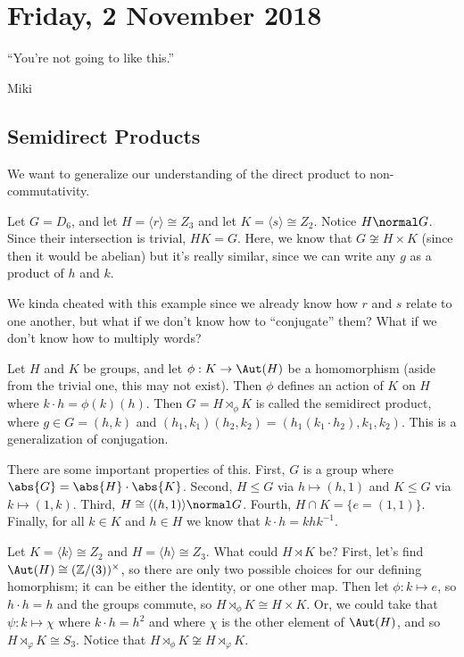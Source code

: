 \section{Friday, 2 November 2018}

\epigraph{``You're not going to like this.''}{Miki}

\subsection{Semidirect Products}
We want to generalize our understanding of the direct product to non-commutativity.

\begin{example}
Let $G = D_6$, and let $H = \langle r  \rangle \cong Z_3$ and let $K = \langle s \rangle \cong Z_2$. Notice $H \normal G$. Since their intersection is trivial, $HK = G$. Here, we know that $G \not\cong H \times K$ (since then it would be abelian) but it's really similar, since we can write any $g$ as a product of $h$ and $k$.
\end{example}

We kinda cheated with this example since we already know how $r$ and $s$ relate to one another, but what if we don't know how to ``conjugate'' them? What if we don't know how to multiply words?

\begin{definition}
Let $H$ and $K$ be groups, and let $\phi : K \to \Aut(H)$ be a homomorphism (aside from the trivial one, this may not exist). Then $\phi$ defines an action of $K$ on $H$ where $k \cdot h = \phi(k)(h)$. Then $G = H \rtimes_\phi K$ is called the semidirect product, where $g \in G = (h,k)$ and $(h_1,k_1)(h_2,k_2) = (h_1(k_1 \cdot h_2), k_1,k_2)$. This is a generalization of conjugation.
\end{definition}

There are some important properties of this. First, $G$ is a group where $\abs{G} = \abs{H} \cdot \abs{K}$. Second, $H \leq G$ via $h \mapsto (h,1)$ and $K \leq G$ via $k \mapsto (1,k)$. Third, $H \cong \langle (h,1) \rangle \normal G$. Fourth, $H \cap K = \{e = (1,1)\}$. Finally, for all $k \in K$ and $h \in H$ we know that $k \cdot h = khk^{-1}$.

\begin{example}
Let $K = \langle k \rangle \cong Z_2$ and $H = \langle h \rangle  \cong Z_3$. What could $H \rtimes K$ be? First, let's find $\Aut(H) \cong (\mathbb{Z}/(3))^\times$, so there are only two possible choices for our defining homorphism; it can be either the identity, or one other map. Then let $\phi : k \mapsto e$, so $h \cdot h = h$ and the groups commute, so $H \rtimes_\phi K \cong H \times K$. Or, we could take that $\psi : k \mapsto \chi$ where $k \cdot h = h^2$ and where $\chi$ is the other element of $\Aut(H)$, and so $H \rtimes_\varphi K \cong S_3$. Notice that $H \rtimes_\phi K \not\cong H \rtimes_\varphi K$.
\end{example}

